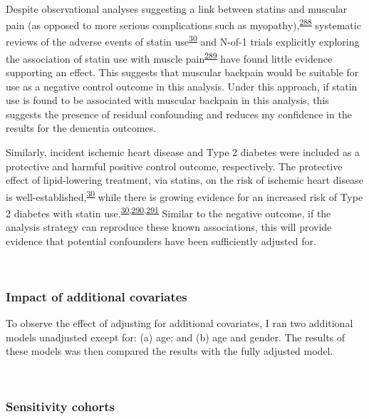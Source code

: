 \documentclass[a4paper, twoside]{templates/ociamthesis}
\begin{document}
~

Despite observational analyses suggesting a link between statins and muscular pain (as opposed to more serious complications such as myopathy),\textsuperscript{\protect\hyperlink{ref-selva-ocallaghan2018}{288}} systematic reviews of the adverse events of statin use\textsuperscript{\protect\hyperlink{ref-collins2016a}{30}} and N-of-1 trials explicitly exploring the association of statin use with muscle pain\textsuperscript{\protect\hyperlink{ref-herrett2021}{289}} have found little evidence supporting an effect. This suggests that muscular backpain would be suitable for use as a negative control outcome in this analysis. Under this approach, if statin use is found to be associated with muscular backpain in this analysis, this suggests the presence of residual confounding and reduces my confidence in the results for the dementia outcomes.

Similarly, incident ischemic heart disease and Type 2 diabetes were included as a protective and harmful positive control outcome, respectively. The protective effect of lipid-lowering treatment, via statins, on the risk of ischemic heart disease is well-established,\textsuperscript{\protect\hyperlink{ref-collins2016a}{30}} while there is growing evidence for an increased risk of Type 2 diabetes with statin use.\textsuperscript{\protect\hyperlink{ref-collins2016a}{30},\protect\hyperlink{ref-macedo2014}{290},\protect\hyperlink{ref-smit2020}{291}} Similar to the negative outcome, if the analysis strategy can reproduce these known associations, this will provide evidence that potential confounders have been sufficiently adjusted for.

~

\hypertarget{impact-of-additional-covariates}{%
\subsubsection{Impact of additional covariates}\label{impact-of-additional-covariates}}

To observe the effect of adjusting for additional covariates, I ran two additional models unadjusted except for: (a) age; and (b) age and gender. The results of these models was then compared the results with the fully adjusted model.

~

\hypertarget{sensitivity-cohorts}{%
\subsubsection{Sensitivity cohorts}\label{sensitivity-cohorts}}
\end{document}
